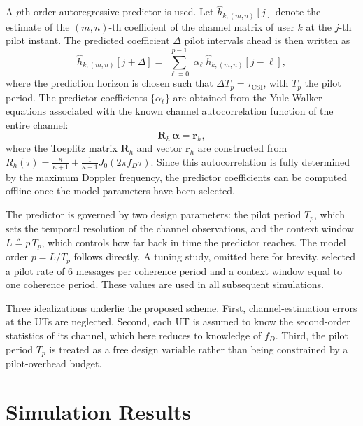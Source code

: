 \documentclass[conference]{IEEEtran}
\begin{document}
A $p$th-order autoregressive predictor is used.
Let $\hat{h}_{k,(m,n)}[j]$ denote the estimate of the $(m,n)$-th coefficient of the channel matrix of user $k$ at the $j$-th pilot instant.
The predicted coefficient $\Delta$ pilot intervals ahead is then written as
\begin{equation}
\label{eq:ar_predictor_paper}
    \hat{h}_{k,(m,n)}[j+\Delta] = \; \sum_{\ell=0}^{p-1} \; \alpha_\ell \; \hat{h}_{k,(m,n)}[j-\ell],
\end{equation}
where the prediction horizon is chosen such that $\Delta T_p = \tau_{\mathrm{CSI}}$, with $T_p$ the pilot period.
The predictor coefficients $\{\alpha_\ell\}$ are obtained from the Yule-Walker equations associated with the known channel autocorrelation function of the entire channel:
\begin{equation}
\label{eq:yule_walker_paper}
    \mathbf{R}_h \, \boldsymbol{\alpha} = \mathbf{r}_h,
\end{equation}
where the Toeplitz matrix $\mathbf{R}_h$ and vector $\mathbf{r}_h$ are constructed from $R_h(\tau)= \tfrac{\kappa}{\kappa+1} + \tfrac{1}{\kappa+1} J_0(2\pi f_D \tau)$.
Since this autocorrelation is fully determined by the maximum Doppler frequency, the predictor coefficients can be computed offline once the model parameters have been selected.

The predictor is governed by two design parameters: the pilot period $T_p$, which sets the temporal resolution of the channel observations, and the context window $L \triangleq p\,T_p$, which controls how far back in time the predictor reaches.
The model order $p = L/T_p$ follows directly.
A tuning study, omitted here for brevity, selected a pilot rate of $6$ messages per coherence period and a context window equal to one coherence period. These values are used in all subsequent simulations.

Three idealizations underlie the proposed scheme.
First, channel-estimation errors at the \acp{UT} are neglected.
Second, each \ac{UT} is assumed to know the second-order statistics of its channel, which here reduces to knowledge of $f_D$.
Third, the pilot period $T_p$ is treated as a free design variable rather than being constrained by a pilot-overhead budget.

\section{Simulation Results}
\label{section:simulation_results}
\end{document}
